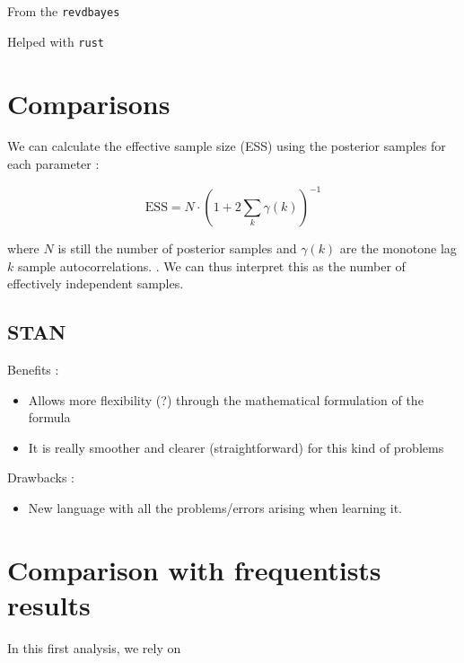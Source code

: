 From the \texttt{revdbayes}

Helped with \texttt{rust}
\section{Comparisons}

\citet{hartmann_bayesian_2016}
We can calculate the effective sample size (ESS) using the posterior samples for each parameter : 

\begin{equation}
\text{ESS}=N\cdot (1+2\sum_k\gamma(k))^{-1}
\end{equation}

where $N$ is still the number of posterior samples and $\gamma(k)$ are the monotone lag $k$ sample autocorrelations. \citet{geyer__1992}. We can thus interpret this as the number of effectively independent samples. 


\subsection{STAN}

Benefits : 

\begin{itemize}
	\item Allows more flexibility (?) through the mathematical formulation of the formula
	\item It is really smoother and clearer (straightforward) for this kind of problems 
\end{itemize}

Drawbacks : 

\begin{itemize}
	\item New language with all the problems/errors arising when learning it. 
\end{itemize}



\section{Comparison with frequentists results}

In this first analysis, we rely on 
